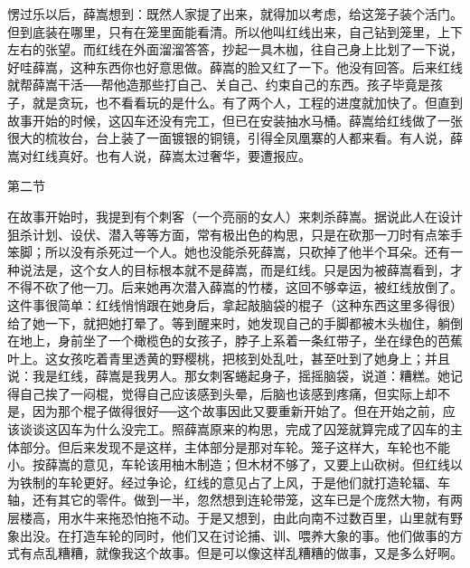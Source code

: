 愣过乐以后，薛嵩想到：既然人家提了出来，就得加以考虑，给这笼子装个活门。但到底装在哪里，只有在笼里面能看清。所以他叫红线出来，自己钻到笼里，上下左右的张望。而红线在外面溜溜答答，抄起一具木枷，往自己身上比划了一下说，好哇薛嵩，这种东西你也好意思做。薛嵩的脸又红了一下。他没有回答。后来红线就帮薛嵩干活──帮他造那些打自己、关自己、约束自己的东西。孩子毕竟是孩子，就是贪玩，也不看看玩的是什么。有了两个人，工程的进度就加快了。但直到故事开始的时候，这囚车还没有完工，但已在安装抽水马桶。薛嵩给红线做了一张很大的梳妆台，台上装了一面镀银的铜镜，引得全凤凰寨的人都来看。有人说，薛嵩对红线真好。也有人说，薛嵩太过奢华，要遭报应。 

第二节 

在故事开始时，我提到有个刺客（一个亮丽的女人）来刺杀薛嵩。据说此人在设计狙杀计划、设伏、潜入等等方面，常有极出色的构思，只是在砍那一刀时有点笨手笨脚；所以没有杀死过一个人。她也没能杀死薛嵩，只砍掉了他半个耳朵。还有一种说法是，这个女人的目标根本就不是薛嵩，而是红线。只是因为被薛嵩看到，才不得不砍了他一刀。后来她再次潜入薛嵩的竹楼，这回不够幸运，被红线放倒了。这件事很简单：红线悄悄跟在她身后，拿起敲脑袋的棍子（这种东西这里多得很）给了她一下，就把她打晕了。等到醒来时，她发现自己的手脚都被木头枷住，躺倒在地上，身前坐了一个橄榄色的女孩子，脖子上系着一条红带子，坐在绿色的芭蕉叶上。这女孩吃着青里透黄的野樱桃，把核到处乱吐，甚至吐到了她身上；并且说：我是红线，薛嵩是我男人。那女刺客蜷起身子，摇摇脑袋，说道：糟糕。她记得自己挨了一闷棍，觉得自己应该感到头晕，后脑也该感到疼痛，但实际上却不是，因为那个棍子做得很好──这个故事因此又要重新开始了。但在开始之前，应该谈谈这囚车为什么没完工。照薛嵩原来的构思，完成了囚笼就算完成了囚车的主体部分。但后来发现不是这样，主体部分是那对车轮。笼子这样大，车轮也不能小。按薛嵩的意见，车轮该用柚木制造；但木材不够了，又要上山砍树。但红线以为铁制的车轮更好。经过争论，红线的意见占了上风，于是他们就打造轮辐、车轴，还有其它的零件。做到一半，忽然想到连轮带笼，这车已是个庞然大物，有两层楼高，用水牛来拖恐怕拖不动。于是又想到，由此向南不过数百里，山里就有野象出没。在打造车轮的同时，他们又在讨论捕、训、喂养大象的事。他们做事的方式有点乱糟糟，就像我这个故事。但是可以像这样乱糟糟的做事，又是多么好啊。 

